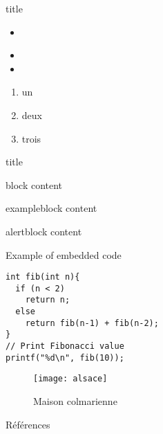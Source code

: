 


\frame[plain]{\titlepage} 
	
\begin{frame}{title}
\begin{itemize}
	\item {}\cite{Feynman1941}
	\item {}
	\item {}
\end{itemize}
\begin{enumerate}
	\item un
	\item deux
	\item trois
\end{enumerate}
\end{frame}

\begin{frame}{title}
\begin{block}{block}
	content
\end{block}
\begin{exampleblock}{exampleblock}
content
\end{exampleblock}
\begin{alertblock}{alertblock}
content
\end{alertblock}
\end{frame}

\begin{frame}[fragile]{Example of embedded code}
	\begin{verbatim}
int fib(int n){
  if (n < 2)
    return n;
  else
    return fib(n-1) + fib(n-2);
}
// Print Fibonacci value
printf("%d\n", fib(10));
\end{verbatim}
\end{frame}

\begin{frame}{}
\begin{figure}[htbp]
\centering
\texttt{[image: alsace]}
\caption{Maison colmarienne}
\end{figure}
\end{frame}

\begin{frame}{Références}
\printbibliography
\end{frame}

